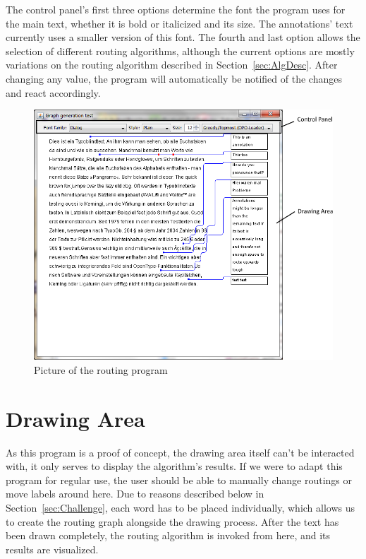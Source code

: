 \documentclass[11pt,a4paper]{vutinfth}
\begin{document}
The control panel's first three options determine the font the program uses for the main text, whether it is bold or italicized and its size. The annotations' text currently uses a smaller version of this font. The fourth and last option allows the selection of different routing algorithms, although the current options are mostly variations on the routing algorithm described in Section~\ref*{sec:AlgDesc}. After changing any value, the program will automatically be notified of the changes and react accordingly.

\begin{figure}%
	\captionsetup{justification=centering, margin=0.75cm}
	\centering
	\includegraphics[scale=0.75]{ProgramWindowAnnotated.png}
	\caption{Picture of the routing program}
	\label{fig:ProgWindow}
\end{figure}

\section{Drawing Area}
As this program is a proof of concept, the drawing area itself can't be interacted with, it only serves to display the algorithm's results. If we were to adapt this program for regular use, the user should be able to manually change routings or move labels around here.
Due to reasons described below in Section~\ref*{sec:Challenge}, each word has to be placed individually, which allows us to create the routing graph alongside the drawing process. 
After the text has been drawn completely, the routing algorithm is invoked from here, and its results are visualized.
\end{document}
